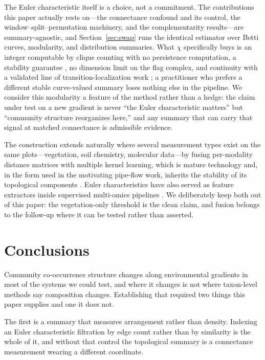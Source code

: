 \documentclass[review,12pt,authoryear]{elsarticle}
\theoremstyle{remark}
\begin{document}
The Euler characteristic itself is a choice, not a commitment. The
contributions this paper actually rests on---the connectance confound and
its control, the window--split--permutation machinery, and the
complementarity results---are summary-agnostic, and Section~\ref{sec:swap}
runs the identical estimator over Betti curves, modularity, and distribution
summaries. What $\chi$ specifically buys is an integer computable by clique
counting with no persistence computation, a stability guarantee
\citep{dlotko2023eulercurves}, no dimension limit on the flag complex, and
continuity with a validated line of transition-localization work
\citep{sharma2026ecs,koenig2026churn}; a practitioner who prefers a different
stable curve-valued summary loses nothing else in the pipeline. We consider
this modularity a feature of the method rather than a hedge: the claim under
test on a new gradient is never ``the Euler characteristic matters'' but
``community structure reorganizes here,'' and any summary that can carry that
signal at matched connectance is admissible evidence.

The construction extends naturally where several measurement types exist on
the same plots---vegetation, soil chemistry, molecular data---by fusing
per-modality distance matrices with multiple kernel learning, which is mature
technology \citep{mariette2018mixkernel} and, in the form used in the
motivating pipe-flow work, inherits the stability of its topological
components \citep{koenig2026churn}. Euler characteristics have also served as
feature extractors inside supervised multi-omics pipelines
\citep{jain2024deepida}. We deliberately keep both out of this paper: the
vegetation-only threshold is the clean claim, and fusion belongs to the
follow-up where it can be tested rather than asserted.

\section{Conclusions}

Community co-occurrence structure changes along environmental gradients in
most of the systems we could test, and where it changes is not where
taxon-level methods say composition changes. Establishing that required two
things this paper supplies and one it does not.

The first is a summary that measures arrangement rather than density.
Indexing an Euler characteristic filtration by edge count rather than by
similarity is the whole of it, and without that control the topological
summary is a connectance measurement wearing a different coordinate.
\end{document}
